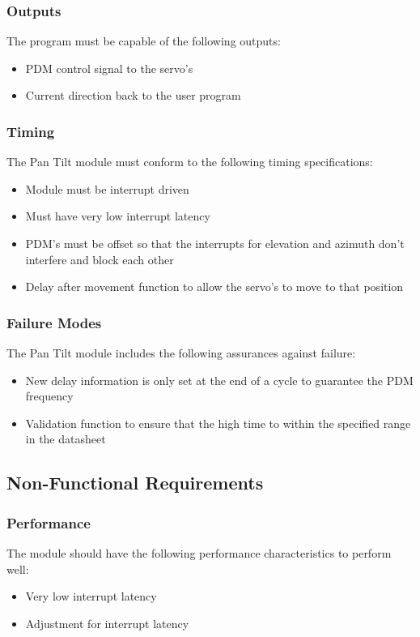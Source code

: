 \documentclass[]{report}
\begin{document}
\subsubsection{Outputs}
The program must be capable of the following outputs:
\begin{itemize}
	\item PDM control signal to the servo's
	\item Current direction back to the user program
\end{itemize}

\subsubsection{Timing}
The Pan Tilt module must conform to the following timing specifications:
\begin{itemize}
	\item Module must be interrupt driven
	\item Must have very low interrupt latency
	\item PDM's must be offset so that the interrupts for elevation and azimuth don't interfere and block each other
	\item Delay after movement function to allow the servo's to move to that position
\end{itemize}

\subsubsection{Failure Modes}
The Pan Tilt module includes the following assurances against failure:
\begin{itemize}
	\item New delay information is only set at the end of a cycle to guarantee the PDM frequency
	\item Validation function to ensure that the high time to within the specified range in the datasheet
\end{itemize}

\subsection{Non-Functional Requirements}
\subsubsection{Performance}
The module should have the following performance characteristics to perform well:
\begin{itemize}
	\item Very low interrupt latency
	\item Adjustment for interrupt latency
\end{itemize}
\end{document}
